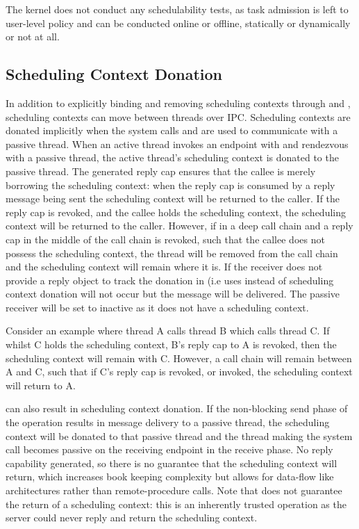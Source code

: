 The kernel does not conduct any schedulability tests, as task admission is left to user-level policy
and can be conducted online or offline, statically or dynamically or not at all.

\subsection{Scheduling Context Donation}

In addition to explicitly binding and removing scheduling contexts through
 and
, scheduling contexts can move
between threads over IPC.  Scheduling contexts are donated implicitly when the system calls
 and  are used to
communicate with a passive thread.  When an active thread invokes an endpoint with
 and rendezvous with a passive thread, the active thread's scheduling
context is donated to the passive thread. The generated reply cap ensures that the callee is merely
borrowing the scheduling context: when the reply cap is consumed by a reply message being sent the
scheduling context will be returned to the caller.  If the reply cap is revoked, and the callee
holds the scheduling context, the scheduling context will be returned to the caller.  However, if in
a deep call chain and a reply cap in the middle of the call chain is revoked, such that the callee
does not possess the scheduling context, the thread will be removed from the call chain and the
scheduling context will remain where it is.  If the receiver does not provide a reply object to
track the donation in (i.e uses  instead of
 scheduling context donation will not occur but the message will be
delivered. The passive receiver will be set to inactive as it does not have a scheduling context.

Consider an example where thread A calls thread B which calls thread C.  If whilst C holds the
scheduling context, B's reply cap to A is revoked, then the scheduling context will remain with C.
However, a call chain will remain between A and C, such that if C's reply cap is revoked, or
invoked, the scheduling context will return to A.

 can also result in scheduling context donation.
If the non-blocking send phase of the operation results in message delivery to a passive thread, the
scheduling context will be donated to that passive thread and the thread making the system call becomes passive on the
receiving endpoint in the receive phase.  No reply capability generated, so there
is no guarantee that the scheduling context will return, which increases book keeping complexity but allows
for data-flow like architectures rather than remote-procedure calls. Note that 
does not guarantee the return of a scheduling context: this is an inherently trusted operation as the
server could never reply and return the scheduling context.

